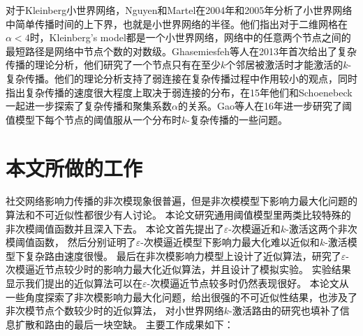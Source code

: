 对于Kleinberg小世界网络\cite{Kleinberg2001small}，Nguyen和Martel在2004年\cite{Martel2004analyzing}和2005年\cite{Nguyen2005analyzing}分析了小世界网络中简单传播时间的上下界，也就是小世界网络的半径。他们指出对于二维网格在$\alpha<4$时，Kleinberg’s model都是一个小世界网络，网络中的任意两个节点之间的最短路径是网络中节点个数的对数级。Ghasemiesfeh等人\cite{Ghasemiesfeh2013complex}在2013年首次给出了复杂传播的理论分析，他们研究了一个节点只有在至少$k$个邻居被激活时才能激活的$k$-复杂传播。他们的理论分析支持了弱连接在复杂传播过程中作用较小的观点，同时指出复杂传播的速度很大程度上取决于弱连接的分布，在15年\cite{ebrahimi2015complex}他们和Schoenebeck一起进一步探索了复杂传播和聚集系数$\alpha$的关系。Gao等人在16年\cite{gao2016gt}进一步研究了阈值模型下每个节点的阈值服从一个分布时$k$-复杂传播的一些问题。




\section{本文所做的工作}
社交网络影响力传播的非次模现象很普遍，但是非次模模型下影响力最大化问题的算法和不可近似性都很少有人讨论。
本论文研究通用阈值模型里两类比较特殊的非次模阈值函数并且深入下去。
本论文首先提出了$\varepsilon$-次模逼近和$k$-激活这两个非次模阈值函数，
然后分别证明了$\varepsilon$-次模逼近模型下影响力最大化难以近似和$k$-激活模型下复杂路由速度很慢。
最后在非次模影响力模型上设计了近似算法，研究了$\varepsilon$-次模逼近节点较少时的影响力最大化近似算法，并且设计了模拟实验。
实验结果显示我们提出的近似算法可以在$\varepsilon$-次模逼近节点较多时仍然表现很好。
本论文从一些角度探索了非次模影响力最大化问题，给出很强的不可近似性结果，也涉及了非次模节点个数较少时的近似算法，
对小世界网络$k$-激活路由的研究也填补了信息扩散和路由的最后一块空缺。
主要工作成果如下：



